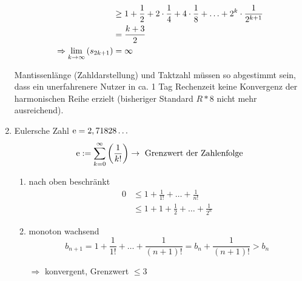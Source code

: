 \begin{example}[Anwendungen]
\begin{enumerate}
\begin{align*}
      &\geq 1 + \frac 1 2 + 2 \cdot \frac 1 4 + 4 \cdot \frac 1 8 + \ldots + 2^k \cdot\frac 1 {2^{k+1}}\\
      &= \frac{k+3} 2 \\
      \Rightarrow \liminfty[k]{s_{2k+1}} &= \infty
    \end{align*}
    \begin{note}
      Mantissenlänge (Zahldarstellung) und Taktzahl müssen so abgestimmt sein, dass ein unerfahrenere Nutzer in ca. 1 Tag Rechenzeit keine Konvergenz der harmonischen Reihe erzielt (bisheriger Standard $R \ast 8$ nicht mehr ausreichend).
    \end{note}
  \item Eulersche Zahl $\euler = 2,71828\ldots$
    \begin{equation*}
      \euler := \sum\limits_{k=0}^\infty \left( \frac 1 {k!} \right) \rightarrow \text{ Grenzwert der Zahlenfolge}
    \end{equation*}
    \begin{enumerate}
      \item nach oben beschränkt
        \begin{align*}
          0 &\leq 1 + \frac 1 {1!} + \ldots + \frac 1 {n!} \\
          &\leq 1+1+\frac 1 2 + \ldots + \frac 1 {2^n}
        \end{align*}
      \item monoton wachsend
        \begin{equation*}
          b_{n+1} = 1 + \frac 1 {1!} + \ldots + \frac 1 {(n+1)!} = b_n + \frac 1 {(n+1)!} > b_n
        \end{equation*}
      \item[$\Rightarrow$] konvergent, Grenzwert $\leq 3$
    \end{enumerate}

\end{enumerate}

\end{example}